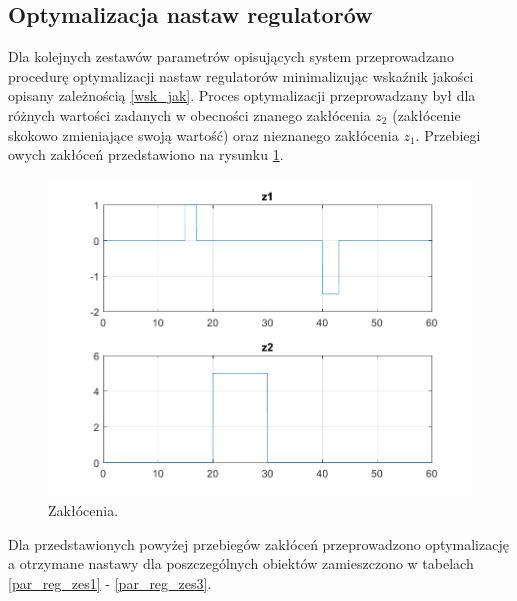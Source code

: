 \subsection{Optymalizacja nastaw regulatorów}
Dla kolejnych zestawów parametrów opisujących system przeprowadzano procedurę optymalizacji nastaw regulatorów minimalizując wska\'znik jakości opisany zależnością \ref{wsk_jak}. Proces optymalizacji przeprowadzany był dla różnych wartości zadanych w obecności znanego zakłócenia $z_2$ (zakłócenie skokowo zmieniające swoją wartość) oraz nieznanego zakłócenia $z_1$. Przebiegi owych zakłóceń przedstawiono na rysunku \ref{fig_zaklocenia}. 

\begin{figure}[h!]
	\centering
	\includegraphics[scale = 0.7]{fig/Z1_New_Signal_1/fig3_1_5.png}
	\caption		
	{Zakłócenia.}
	\label{fig_zaklocenia}
\end{figure} 

Dla przedstawionych powyżej przebiegów zakłóceń przeprowadzono optymalizację a otrzymane nastawy dla poszczególnych obiektów zamieszczono w tabelach \ref{par_reg_zes1} - \ref{par_reg_zes3}. 

